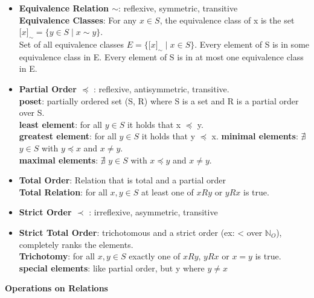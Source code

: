 \begin{itemize}[noitemsep,topsep=0pt,leftmargin=*]
    \item \textbf{Equivalence Relation $\sim$}: reflexive, symmetric, transitive \\
    \textbf{Equivalence Classes}: For any $x \in S$, the equivalence class of x is the set $\lbrack x\rbrack_{\sim} = \{y \in S \mid x \sim y\}$. \\
    Set of all equivalence classes $E = \{\lbrack x\rbrack_{\sim} \mid x \in S\}$. Every element of S is in some equivalence class in E. Every element of S is in at most one equivalence class in E. 
    \item \textbf{Partial Order $\preceq$ }: reflexive, antisymmetric, transitive.  \\ 
    \textbf{poset}: partially ordered set (S, R) where S is a set and R is a partial order over S. \\
    \textbf{least element}: for all $y \in S$ it holds that x $\preceq$ y. \\ %
    \textbf{greatest element}: for all $y \in S$ it holds that y $\preceq$ x. %
    \textbf{minimal elements}: $\nexists$ $y \in S$ with $y \preceq x$ and $x \neq y$. \\ 
    \textbf{maximal elements}: $\nexists$ $y \in S$ with $x \preceq y $ and $x \neq y$. \\ 
    \item \textbf{Total Order}: Relation that is total and a partial order \\ 
    \textbf{Total Relation}: for all $x, y \in S$ at least one of $xRy$ or $yRx$ is true.
    \item \textbf{Strict Order $\prec$ }: irreflexive, asymmetric, transitive    
    \item \textbf{Strict Total Order}: trichotomous and a strict order (ex: < over $\mathbb{N}_O$), completely ranks the elements. \\ 
    \textbf{Trichotomy}: for all $x, y \in S$ exactly one of $xRy$, $yRx$ or $x = y$ is true. \\
    \textbf{special elements}: like partial order, but y where $y \neq x$
\end{itemize}
\textbf{Operations on Relations}\\
